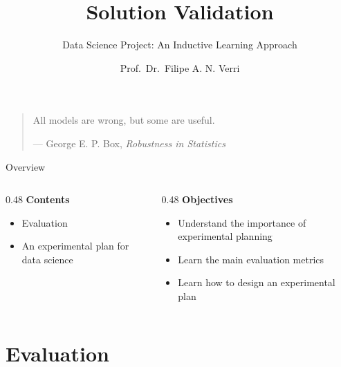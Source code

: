 


\title{Solution Validation}
\subtitle{Data Science Project: An Inductive Learning Approach}
\author{Prof.~Dr.~Filipe A. N. Verri}
\date{}



\maketitle
\bookframe


\begin{frame}{}
  \vfill
  \begin{quote}
    All models are wrong, but some are useful.
    \begin{flushright}
      --- George E. P. Box, \textit{Robustness in Statistics}
    \end{flushright}
  \end{quote}
  \vfill
\end{frame}


\begin{frame}{Overview}
  \begin{columns}[T]
    \begin{column}{0.48\textwidth}
      \textbf{Contents}
      \begin{itemize}
        \item Evaluation
        \item An experimental plan for data science
      \end{itemize}
    \end{column}
    \begin{column}{0.48\textwidth}
      \textbf{Objectives}
      \begin{itemize}
        \item Understand the importance of experimental planning
        \item Learn the main evaluation metrics
        \item Learn how to design an experimental plan
      \end{itemize}
    \end{column}
  \end{columns}
\end{frame}

\section{Evaluation}

